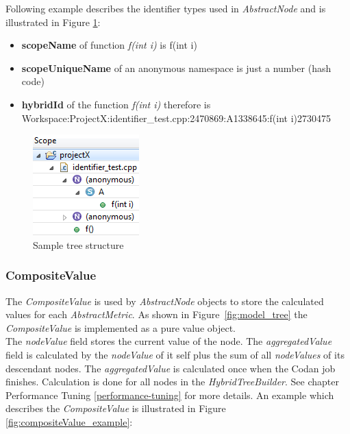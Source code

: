 \documentclass[11pt,a4paper,oneside]{scrreprt}
\begin{document}
Following example describes the identifier types used in \textit{AbstractNode} and is illustrated in Figure \ref{fig:identifiers}:
\begin{itemize}
\item \textbf{scopeName} of function \textit{f(int i)} is f(int i)
\item \textbf{scopeUniqueName} of an anonymous namespace is just a number (hash code)
\item \textbf{hybridId} of the function \textit{f(int i)} therefore is \\ Workspace:ProjectX:identifier\_test.cpp:2470869:A1338645:f(int i)2730475
\end{itemize}

\begin{figure}[th]
\begin{center}
\includegraphics[scale=0.8]{figures/metriculator_hybrid_scope.png}
\end{center}
\caption{Sample tree structure}
\label{fig:identifiers}
\end{figure}

\subsubsection{CompositeValue}
The \textit{CompositeValue} is used by \textit{AbstractNode} objects to store the calculated values for each \textit{AbstractMetric}. As shown in Figure~\ref{fig:model_tree} the \textit{CompositeValue} is implemented as a pure value object.\\
The \textit{nodeValue} field stores the current value of the node. The \textit{aggregatedValue} field is calculated by the \textit{nodeValue} of it self plus the sum of all \textit{nodeValues} of its descendant nodes. The \textit{aggregatedValue} is calculated once when the Codan job finishes. Calculation is done for all nodes in the \textit{HybridTreeBuilder}. See chapter Performance Tuning \ref{performance-tuning} for more details.
An example which describes the \textit{CompositeValue} is illustrated in Figure \ref{fig:compositeValue_example}:\\
\end{document}
